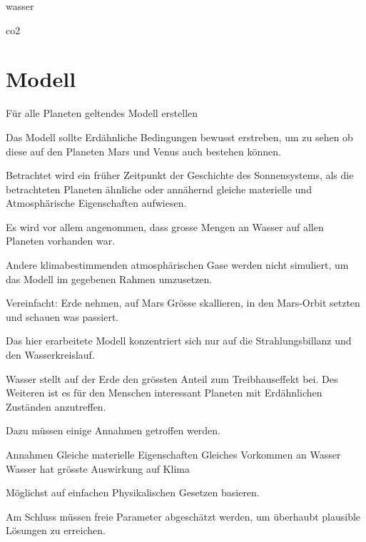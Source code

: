 \begin{refsection}
wasser

co2


\section{Modell}


	Für alle Planeten geltendes Modell erstellen
	
	Das Modell sollte Erdähnliche Bedingungen bewusst erstreben, um zu sehen ob diese auf den Planeten Mars und Venus auch bestehen können.
	
	Betrachtet wird ein früher Zeitpunkt der Geschichte des Sonnensystems, als die betrachteten Planeten ähnliche oder annähernd gleiche materielle und Atmosphärische Eigenschaften aufwiesen.
	
	Es wird vor allem angenommen, dass grosse Mengen an Wasser auf allen Planeten vorhanden war.
	
	
	Andere klimabestimmenden atmosphärischen Gase werden nicht simuliert, um das Modell im gegebenen Rahmen umzusetzen.

	
	Vereinfacht: Erde nehmen, auf Mars Grösse skallieren, in den Mars-Orbit setzten und schauen was passiert. 
	

Das hier erarbeitete Modell konzentriert sich nur auf die Strahlungsbillanz und den Wasserkreislauf.

Wasser stellt auf der Erde den grössten Anteil zum Treibhauseffekt bei.
Des Weiteren ist es für den Menschen interessant Planeten mit Erdähnlichen Zuständen anzutreffen.



 Dazu müssen einige Annahmen getroffen werden.	
	
	Annahmen
		Gleiche materielle Eigenschaften
		Gleiches Vorkommen an Wasser
		Wasser hat grösste Auswirkung auf Klima
	
	
Möglichst auf einfachen Physikalischen Gesetzen basieren.	
	
	
Am Schluss müssen freie Parameter abgeschätzt werden, um überhaubt plausible Lösungen zu erreichen.



\end{refsection}
